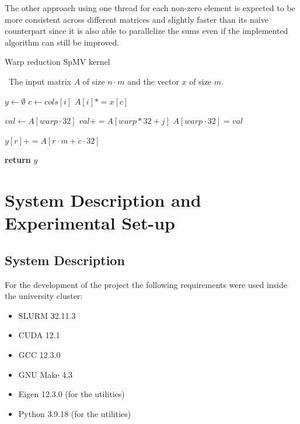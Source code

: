 \documentclass[conference]{IEEEtran}
\begin{document}
    The other approach using one thread for each non-zero element is expected
    to be more consistent across different matrices and slightly faster than
    its naive counterpart since it is also able to parallelize the sums even if
    the implemented algorithm can still be improved.
    \begin{algorithm}[!ht]
        \caption{Warp reduction SpMV kernel}
        \algorithmicrequire~The input matrix $A$ of size $n \cdot m$ and the vector $x$ of size $m$.
        \begin{algorithmic}[1]
                \State $y \gets \emptyset$
                    \State $c \gets cols[i]$
                    \State $A[i] *= x[c]$
                \EndFor

                    \State $val \gets A[warp \cdot 32]$
                            \State $val += A[warp * 32 + j]$
                        \EndFor
                    \EndFor
                    \State $A[warp \cdot 32] = val$
                \EndFor

                        \State $y[r] += A[r \cdot m + c \cdot 32]$
                    \EndFor
                \EndFor

                \State \textbf{return} $y$
            \EndProcedure
        \end{algorithmic}
        \label{alg:SpMVrow}
    \end{algorithm}

    \section{System Description and Experimental Set-up}
        \subsection{System Description}

        For the development of the project the following requirements were used
        inside the university cluster:
        \begin{itemize}
            \item SLURM 32.11.3
            \item CUDA 12.1
            \item GCC 12.3.0
            \item GNU Make 4.3
            \item Eigen 12.3.0 (for the utilities)
            \item Python 3.9.18 (for the utilities) 
        \end{itemize}
\end{document}
